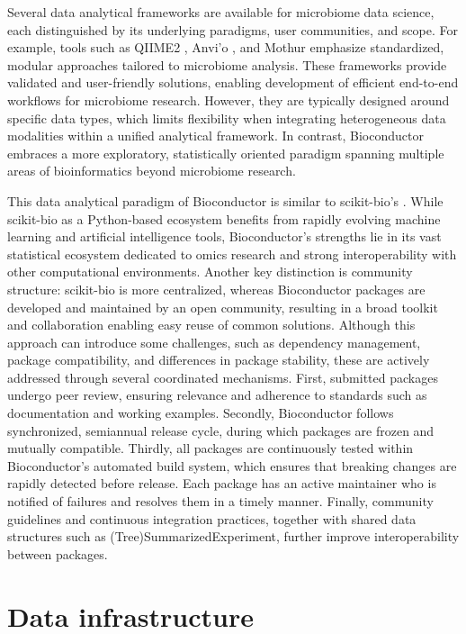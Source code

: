 \documentclass[
  sn-nature,
]{sn-jnl}
\begin{document}
Several data analytical frameworks are available for microbiome data
science, each distinguished by its underlying paradigms, user
communities, and scope. For example, tools such as QIIME2
\citep{bolyen2019}, Anvi'o \citep{eren2021}, and Mothur
\citep{schloss2009} emphasize standardized, modular approaches tailored
to microbiome analysis. These frameworks provide validated and
user-friendly solutions, enabling development of efficient end-to-end
workflows for microbiome research. However, they are typically designed
around specific data types, which limits flexibility when integrating
heterogeneous data modalities within a unified analytical framework. In
contrast, Bioconductor embraces a more exploratory, statistically
oriented paradigm spanning multiple areas of bioinformatics beyond
microbiome research.

This data analytical paradigm of Bioconductor is similar to scikit-bio's
\citep{aton2025}. While scikit-bio as a Python-based ecosystem benefits
from rapidly evolving machine learning and artificial intelligence
tools, Bioconductor's strengths lie in its vast statistical ecosystem
dedicated to omics research and strong interoperability with other
computational environments. Another key distinction is community
structure: scikit-bio is more centralized, whereas Bioconductor packages
are developed and maintained by an open community, resulting in a broad
toolkit and collaboration enabling easy reuse of common solutions.
Although this approach can introduce some challenges, such as dependency
management, package compatibility, and differences in package stability,
these are actively addressed through several coordinated mechanisms.
First, submitted packages undergo peer review, ensuring relevance and
adherence to standards such as documentation and working examples.
Secondly, Bioconductor follows synchronized, semiannual release cycle,
during which packages are frozen and mutually compatible. Thirdly, all
packages are continuously tested within Bioconductor's automated build
system, which ensures that breaking changes are rapidly detected before
release. Each package has an active maintainer who is notified of
failures and resolves them in a timely manner. Finally, community
guidelines and continuous integration practices, together with shared
data structures such as (Tree)SummarizedExperiment, further improve
interoperability between packages.

\section{Data infrastructure}\label{sec-infra}
\end{document}
